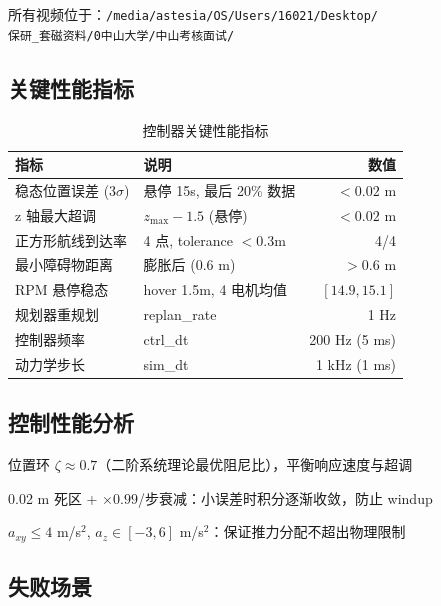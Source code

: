 \documentclass[12pt,a4paper]{article}
\begin{document}
所有视频位于：\texttt{/media/astesia/OS/Users/16021/Desktop/} \\
\texttt{保研\_套磁资料/0中山大学/中山考核面试/}

\subsection{关键性能指标}

\begin{table}[H]
\centering
\caption{控制器关键性能指标}
\label{tab:metrics}
\small
\begin{tabularx}{\textwidth}{l X r}
\toprule
\textbf{指标} & \textbf{说明} & \textbf{数值} \\
\midrule
稳态位置误差 (3$\sigma$) & 悬停 15s, 最后 20\% 数据 & $<0.02$ m \\
z 轴最大超调 & $z_{\max}-1.5$ (悬停) & $<0.02$ m \\
正方形航线到达率 & 4 点, tolerance $<0.3$m & 4/4 \\
最小障碍物距离 & 膨胀后 (0.6 m) & $>0.6$ m \\
RPM 悬停稳态 & hover 1.5m, 4 电机均值 & $[14.9, 15.1]$ \\
规划器重规划 & replan\_rate & 1 Hz \\
控制器频率 & ctrl\_dt & 200 Hz (5 ms) \\
动力学步长 & sim\_dt & 1 kHz (1 ms) \\
\bottomrule
\end{tabularx}
\end{table}

\subsection{控制性能分析}

\begin{description}[nosep, leftmargin=*]
  \item[阻尼特性] 位置环 $\zeta \approx 0.7$（二阶系统理论最优阻尼比），平衡响应速度与超调
  \item[积分死区] 0.02 m 死区 + $\times 0.99$/步衰减：小误差时积分逐渐收敛，防止 windup
  \item[加速度限幅] $a_{xy}\leq 4$ m/s$^2$, $a_z\in[-3,6]$ m/s$^2$：保证推力分配不超出物理限制
\end{description}

\subsection{失败场景}
\end{document}
